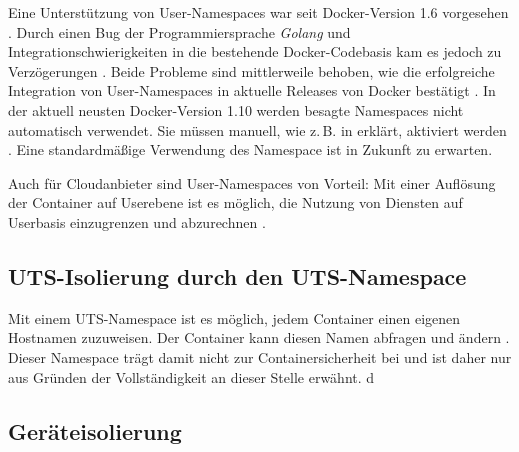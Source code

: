 \documentclass[../main.tex]{subfiles}
\begin{document}
			Eine Unterstützung von User-Namespaces war seit Docker-Version 1.6 vorgesehen \cite{githubUserNamespaceProposal}. Durch einen Bug der Programmiersprache \emph{Golang} und Integrationschwierigkeiten in die bestehende Docker-Codebasis kam es jedoch zu Verzögerungen \cite{nsUserGolangBug}\cite{githubUserNamespaceConflict}\cite{githubUserNamespaceIntegration}. Beide Probleme sind mittlerweile behoben, wie die erfolgreiche Integration von User-Namespaces in aktuelle Releases von Docker bestätigt \cite{githubUserNamespaceIntegration}. In der aktuell neusten Docker-Version 1.10 werden besagte Namespaces nicht automatisch verwendet. Sie müssen manuell, wie z.\,B. in \cite{nsUserEnable} erklärt, aktiviert werden \cite{githubDockerChangelog}. Eine standardmäßige Verwendung des Namespace ist in Zukunft zu erwarten.





			Auch für Cloudanbieter sind User-Namespaces von Vorteil: Mit einer Auflösung der Container auf Userebene ist es möglich, die Nutzung von Diensten auf Userbasis einzugrenzen und abzurechnen \cite[S.3]{nsUserContainerCon}.

		\subsection{\acrshort{UTS}-Isolierung durch den UTS-Namespace}
			Mit einem UTS-Namespace ist es möglich, jedem Container einen eigenen Hostnamen zuzuweisen. Der Container kann diesen Namen abfragen und ändern \cite[S.3]{virtVSContainer}. Dieser Namespace trägt damit nicht zur Containersicherheit bei und ist daher nur aus Gründen der Vollständigkeit an dieser Stelle erwähnt.
d
		\subsection{Geräteisolierung}
\end{document}
